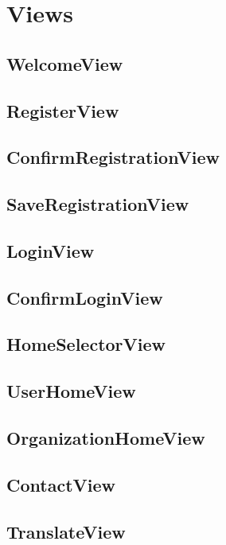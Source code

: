\section{Views}
\label{sec:class-diagram}

\subsection{WelcomeView}
\label{sec:welcomeview}

\subsection{RegisterView}
\label{sec:registerview}

\subsection{ConfirmRegistrationView}
\label{sec:conf}

\subsection{SaveRegistrationView}
\label{sec:saveregistrationview}

\subsection{LoginView}
\label{sec:loginview}

\subsection{ConfirmLoginView}
\label{sec:conf}

\subsection{HomeSelectorView}
\label{sec:homeselectorview}

\subsection{UserHomeView}
\label{sec:homeselectorview}

\subsection{OrganizationHomeView}
\label{sec:homeselectorview}

\subsection{ContactView}
\label{sec:contactview}

\subsection{TranslateView}
\label{sec:translationview}




